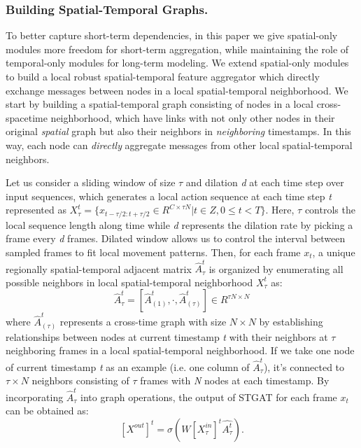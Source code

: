 \documentclass[runningheads]{llncs}
\begin{document}
\subsubsection{Building Spatial-Temporal Graphs.}
To better capture short-term dependencies, in this paper we give spatial-only modules more freedom for short-term aggregation, while maintaining the role of temporal-only modules for long-term modeling. We extend spatial-only modules to build a local robust spatial-temporal feature aggregator which directly exchange messages between nodes in a local spatial-temporal neighborhood. We start by building a spatial-temporal graph consisting of nodes in a local cross-spacetime neighborhood, which have links with not only other nodes in their original \textit{spatial} graph but also their neighbors in \textit{neighboring} timestamps. In this way, each node can \textit{directly} aggregate messages from other local spatial-temporal neighbors. 
  
Let us consider a sliding window of size $\tau$ and dilation \textit{d} at each time step over input sequences, which generates a local action sequence at each time step \textit{t} represented as $X^{t}_{\tau}=\{x_{t-\tau/2:t+\tau/2}\in R^{C\times \tau N}|t\in Z, 0\le t < T\}$. Here, $\tau$ controls the local sequence length along time while \textit{d} represents the dilation rate by picking a frame every \textit{d} frames. Dilated window allows us to control the interval between sampled frames to fit local movement patterns. Then, for each frame $x_t$, a unique regionally spatial-temporal adjacent matrix $\widehat{A}^{t}_{\tau}$ is organized by enumerating all possible neighbors in local spatial-temporal neighborhood $X^{t}_{\tau}$ as:
\begin{equation}
\label{e2}
\widehat{A}^{t}_{\tau}=[\widehat{A}^{t}_{(1)},\cdot,\widehat{A}^{t}_{(\tau)}] \in R^{\tau N\times N}
\end{equation}
where $\widehat{A}^{t}_{(\tau)}$ represents a cross-time graph with size $N\times N$ by establishing relationships between nodes at current timestamp \textit{t} with their neighbors at $\tau$ neighboring frames in a local spatial-temporal neighborhood. If we take one node of current timestamp \textit{t} as an example (i.e. one column of $\widehat{A}^{t}_{\tau}$), it's connected to $\tau\times N$ neighbors consisting of  $\tau$ frames with \textit{N} nodes at each timestamp. By incorporating $\widehat{A}^{t}_{\tau}$ into graph operations, the output of STGAT for each frame $x_t$ can be obtained as:
\begin{equation}
\label{e3}
[X^{out}]^t=\sigma(W[X_{\tau}^{in}]^t\widehat{A^{t}_{\tau}}).
\end{equation}
\end{document}
